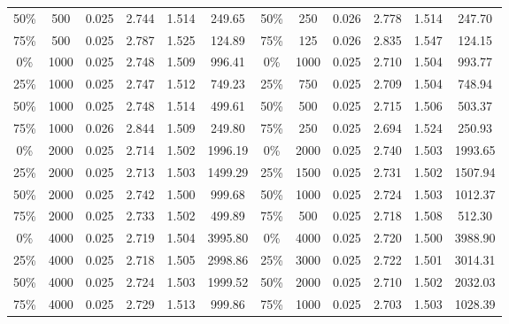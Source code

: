 \documentclass[12pt,letterpaper]{article}
\begin{document}
\begin{table}[htbp]
\begin{tabular}{cccccc||cccccc}
				50\%  & 500   & 0.025 & 2.744 & 1.514 & 249.65 & 50\%  & 250 & 0.026 & 2.778 & 1.514 & 247.70 \\
				75\%  & 500   & 0.025 & 2.787 & 1.525 & 124.89 & 75\%  & 125 & 0.026 & 2.835 & 1.547 & 124.15 \\
				0\%   & 1000  & 0.025 & 2.748 & 1.509 & 996.41 & 0\%   & 1000 & 0.025 & 2.710 & 1.504 & 993.77 \\
				25\%  & 1000   & 0.025 & 2.747 & 1.512 & 749.23 & 25\%  & 750 & 0.025 & 2.709 & 1.504 & 748.94 \\
				50\%  & 1000   & 0.025 & 2.748 & 1.514 & 499.61 & 50\%  & 500 & 0.025 & 2.715 & 1.506 & 503.37 \\
				75\%  & 1000   & 0.026 & 2.844 & 1.509 & 249.80 & 75\%  & 250 & 0.025 & 2.694 & 1.524 & 250.93 \\
				0\%   & 2000  & 0.025 & 2.714 & 1.502 & 1996.19 & 0\%   & 2000 & 0.025 & 2.740 & 1.503 & 1993.65 \\
				25\%  & 2000  & 0.025 & 2.713 & 1.503 & 1499.29 & 25\%  & 1500 & 0.025 & 2.731 & 1.502 & 1507.94 \\
				50\%  & 2000  & 0.025 & 2.742 & 1.500 & 999.68 & 50\%  & 1000  & 0.025 & 2.724 & 1.503 & 1012.37 \\
				75\%  & 2000   & 0.025 & 2.733 & 1.502 & 499.89 & 75\%  & 500 & 0.025 & 2.718 & 1.508 & 512.30 \\
				0\%   & 4000  & 0.025 & 2.719 & 1.504 & 3995.80 & 0\%   & 4000 & 0.025 & 2.720 & 1.500 & 3988.90 \\
				25\%  & 4000  & 0.025 & 2.718 & 1.505 & 2998.86 & 25\%  & 3000 & 0.025 & 2.722 & 1.501 & 3014.31 \\
				50\%  & 4000  & 0.025 & 2.724 & 1.503 & 1999.52 & 50\%  & 2000 & 0.025 & 2.710 & 1.502 & 2032.03 \\
				75\%  & 4000  & 0.025 & 2.729 & 1.513 & 999.86 & 75\%  & 1000 & 0.025 & 2.703 & 1.503 & 1028.39 \\
				\bottomrule
	\end{tabular}%
	\label{tab:rightcensor}%
\end{table}%
\end{document}
